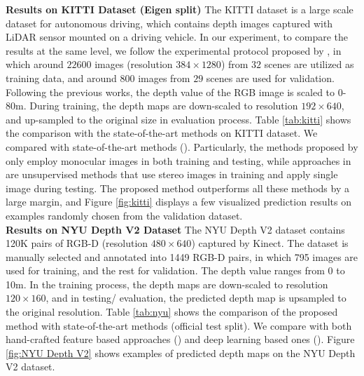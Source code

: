 \documentclass[letterpaper]{article} \usepackage{aaai20}  \usepackage{times}  \usepackage{helvet} \usepackage{courier}  \usepackage{graphicx} \frenchspacing  \setlength{\pdfpagewidth}{8.5in}  \setlength{\pdfpageheight}{11in}  \usepackage{epsfig}
\begin{document}
     \textbf{Results on KITTI Dataset  (Eigen split)} \hspace{0.3cm} The KITTI dataset is a large scale dataset for autonomous driving, which contains depth images captured with LiDAR sensor mounted on a driving vehicle. In our experiment, to compare the results at the same level, we follow the experimental protocol proposed by \cite{Eigen2015Predicting}, in which around $22600$ images (resolution $384 \times 1280$) from $32$ scenes are utilized as training data, and around $800$ images from $29$ scenes are used for validation. Following the previous works, the depth value of the RGB image is scaled to 0-80m. During training, the depth maps are down-scaled to resolution $192 \times 640$, and up-sampled to the original size in evaluation process. Table \ref{tab:kitti} shows the comparison with the state-of-the-art methods on KITTI dataset. We compared with state-of-the-art methods (\cite{Saxena2009Make3D,Liu2015Deep,Zhou2017Unsupervised,Eigen2014Depth,Garg2016Unsupervised,Kundu2018AdaDepth,Zhan2018Unsupervised,Godard2017Unsupervised,Kuznietsov2017Semi}). Particularly, the  methods proposed by \cite{Saxena2009Make3D,Liu2015Deep,Zhou2017Unsupervised,Eigen2014Depth,Kundu2018AdaDepth} only employ monocular images in both training and testing, while approaches in  \cite{Zhan2018Unsupervised,Garg2016Unsupervised,Kuznietsov2017Semi,Godard2017Unsupervised} are unsupervised methods that use stereo images in training and apply single image during testing. The proposed method outperforms all these methods by a large margin, and Figure \ref{fig:kitti} displays a few visualized prediction results on examples randomly chosen from the validation dataset.\\
    \indent\textbf{Results on NYU Depth V2 Dataset} \hspace{0.3cm} The NYU Depth V2 dataset contains 120K pairs of RGB-D (resolution $480 \times 640$) captured by Kinect. The dataset is manually selected and annotated into 1449 RGB-D pairs, in which 795 images are used for training, and the rest for validation. The depth value ranges from 0 to 10m. In the training process, the depth maps are down-scaled to resolution $120 \times 160$, and in testing/ evaluation, the predicted depth map is upsampled to the original resolution. Table \ref{tab:nyu} shows the comparison of the proposed method with state-of-the-art methods (official test split). We compare with both hand-crafted feature based approaches (\cite{Saxena2009Make3D,Kevin2012Depth,Shi2014Pulling}) and deep learning based ones (\cite{Liu2014Discrete,Zhuo2015Indoor,Li2015Depth,Wang2015Towards,Xu2018PAD,Liu2016Learning,Roy2016Monocular}). Figure \ref{fig:NYU Depth V2} shows examples of predicted depth maps on the NYU Depth V2 dataset.
    
\end{document}
